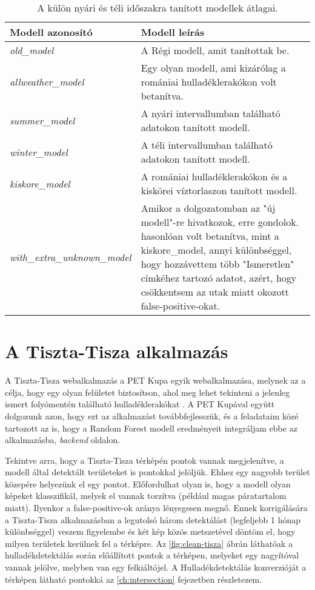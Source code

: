 \begin{table}[H]
	\centering
	\begin{tabular}{ | p{} | p{} | }
		\hline
		\textbf{Modell azonosító} & \textbf{Modell leírás} \\
		\hline \hline
		\emph{old\_model} & A Régi modell, amit \citeauthor{magyar2023} tanítottak be.  \\
		\hline
		\emph{allweather\_model} & Egy olyan modell, ami kizárólag a romániai hulladéklerakókon volt betanítva. \\
		\hline
		\emph{summer\_model} & A nyári intervallumban található adatokon tanított modell.  \\
		\hline
        \emph{winter\_model} & A téli intervallumban található adatokon tanított modell. \\
        \hline
        \emph{kiskore\_model} & A romániai hulladéklerakókon és a kiskörei víztorlaszon tanított modell. \\
		\hline
        \emph{with\_extra\_unknown\_model} & Amikor a dolgozatomban az "új modell"-re hivatkozok, erre gondolok. hasonlóan volt betanítva, mint a kiskore\_model, annyi különbséggel, hogy hozzávettem több "Ismeretlen" címkéhez tartozó adatot, azért, hogy csökkentsem az utak miatt okozott false-positive-okat. \\
		\hline
	\end{tabular}
	\caption{A külön nyári és téli időszakra tanított modellek átlagai.}
	\label{tab:model-ids}
\end{table}

\section{A Tiszta-Tisza alkalmazás}

A Tiszta-Tisza webalkalmazás a PET Kupa egyik webalkalmazása, melynek az a célja, hogy egy olyan felületet biztosítson, ahol meg lehet tekinteni a jelenleg ismert folyómentén található hulladéklerakókat \cite{tisztatisza2024}. A PET Kupával együtt dolgozunk azon, hogy ezt az alkalmazást továbbfejlesszük, és a feladataim közé tartozott az is, hogy a Random Forest modell eredményeit integráljam ebbe az alkalmazásba, \textit{backend} oldalon.

Tekintve arra, hogy a Tiszta-Tisza térképén pontok vannak megjelenítve, a modell által detektált területeket is pontokkal jelöljük. Ehhez egy nagyobb terület közepére helyezünk el egy pontot. Előfordulhat olyan is, hogy a modell olyan képeket klasszifikál, melyek el vannak torzítva (például magas páratartalom miatt). Ilyenkor a false-positive-ok aránya lényegesen megnő. Ennek korrigálására a Tiszta-Tisza alkalmazásban a legutolsó három detektálást (legfeljebb 1 hónap különbséggel) veszem figyelembe és két kép közös metszetével döntöm el, hogy milyen területek kerülnek fel a térképre. Az \ref{fig:clean-tisza} ábrán láthatóak a hulladékdetektálás során előállított pontok a térképen, melyeket egy nagyítóval vannak jelölve, melyben van egy felkiáltójel. A Hulladékdetektálás konverzióját a térképen látható pontokká az \ref{ch:intersection} fejezetben részletezem.

